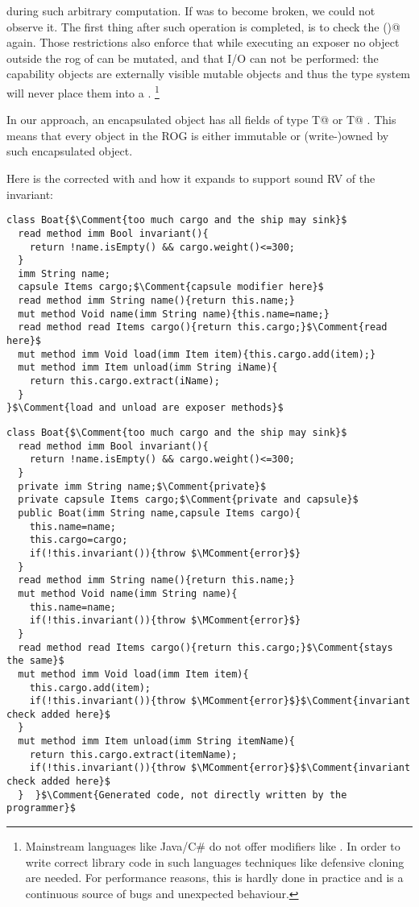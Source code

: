 during such arbitrary computation.
If \Q@this@ was to become broken, we could not  observe it.
The first thing after such operation is completed, is to check the \Q@invariant()@ again.
Those restrictions also enforce that while executing an exposer no object outside the rog of \Q@this@ can be mutated,
and that I/O can not be performed: the capability objects are externally visible mutable objects and thus the type system will
never place them into a \Q@capsule@.%
\footnote{
Mainstream languages like Java/C\# do not offer modifiers like \Q@capsule@.
In order to write correct library code in such languages techniques like
defensive cloning~\cite{Bloch08} are needed.
For performance reasons, this is hardly done in practice and is a continuous source of bugs and unexpected behaviour.
}

In our approach, an encapsulated object has all fields of type \Q@imm T@ or \Q@capsule T@ .
This means that every object in the ROG is either immutable or (write-)owned
by such encapsulated object.

\noindent Here is the corrected \Q@Boat@ with \Q@cargo@ and how it expands to support sound RV of the invariant:


\begin{lstlisting}
class Boat{$\Comment{too much cargo and the ship may sink}$
  read method imm Bool invariant(){
    return !name.isEmpty() && cargo.weight()<=300;
  }
  imm String name;
  capsule Items cargo;$\Comment{capsule modifier here}$
  read method imm String name(){return this.name;}
  mut method Void name(imm String name){this.name=name;}
  read method read Items cargo(){return this.cargo;}$\Comment{read here}$
  mut method imm Void load(imm Item item){this.cargo.add(item);} 
  mut method imm Item unload(imm String iName){
    return this.cargo.extract(iName);
  }
}$\Comment{load and unload are exposer methods}$
\end{lstlisting}
\begin{lstlisting}
class Boat{$\Comment{too much cargo and the ship may sink}$
  read method imm Bool invariant(){
    return !name.isEmpty() && cargo.weight()<=300;
  }
  private imm String name;$\Comment{private}$
  private capsule Items cargo;$\Comment{private and capsule}$
  public Boat(imm String name,capsule Items cargo){
    this.name=name;
    this.cargo=cargo;
    if(!this.invariant()){throw $\MComment{error}$}
  }
  read method imm String name(){return this.name;}
  mut method Void name(imm String name){
    this.name=name;
    if(!this.invariant()){throw $\MComment{error}$}
  }
  read method read Items cargo(){return this.cargo;}$\Comment{stays the same}$
  mut method imm Void load(imm Item item){
    this.cargo.add(item);
    if(!this.invariant()){throw $\MComment{error}$}$\Comment{invariant check added here}$
  } 
  mut method imm Item unload(imm String itemName){
    return this.cargo.extract(itemName);
    if(!this.invariant()){throw $\MComment{error}$}$\Comment{invariant check added here}$
  }  }$\Comment{Generated code, not directly written by the programmer}$
\end{lstlisting}
